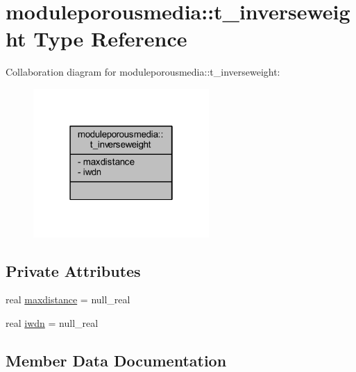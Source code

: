 \hypertarget{structmoduleporousmedia_1_1t__inverseweight}{}\section{moduleporousmedia\+:\+:t\+\_\+inverseweight Type Reference}
\label{structmoduleporousmedia_1_1t__inverseweight}


Collaboration diagram for moduleporousmedia\+:\+:t\+\_\+inverseweight\+:\nopagebreak
\begin{figure}[H]
\begin{center}
\leavevmode
\includegraphics[width=190pt]{structmoduleporousmedia_1_1t__inverseweight__coll__graph}
\end{center}
\end{figure}
\subsection*{Private Attributes}
\begin{DoxyCompactItemize}
\item 
real \mbox{\hyperlink{structmoduleporousmedia_1_1t__inverseweight_a9336b7bb2cc12cdc96bd718a32ae408c}{maxdistance}} = null\+\_\+real
\item 
real \mbox{\hyperlink{structmoduleporousmedia_1_1t__inverseweight_a6d1e9a923204c167ffc79b59f4f5e4e3}{iwdn}} = null\+\_\+real
\end{DoxyCompactItemize}


\subsection{Member Data Documentation}
\mbox{\label{structmoduleporousmedia_1_1t__inverseweight_a6d1e9a923204c167ffc79b59f4f5e4e3}} 
